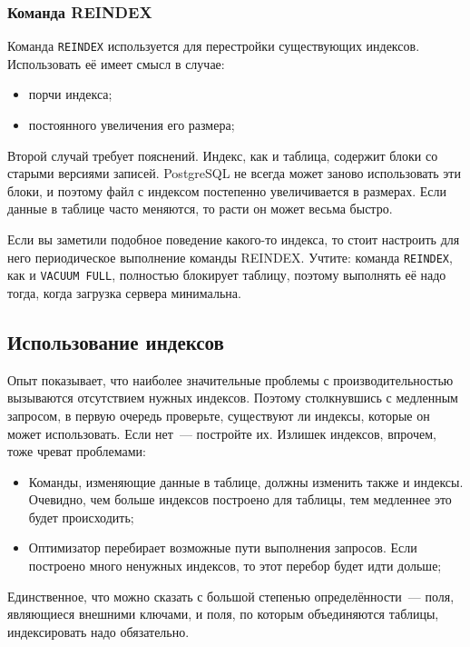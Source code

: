 \subsubsection{Команда REINDEX}

Команда \lstinline!REINDEX! используется для перестройки существующих индексов. Использовать её имеет смысл в случае:

\begin{itemize}
  \item порчи индекса;
  \item постоянного увеличения его размера;
\end{itemize}

Второй случай требует пояснений. Индекс, как и таблица, содержит блоки со старыми версиями записей. PostgreSQL не всегда может заново использовать эти блоки, и поэтому файл с индексом постепенно увеличивается в размерах. Если данные в таблице часто меняются, то расти он может весьма быстро.

Если вы заметили подобное поведение какого-то индекса, то стоит настроить для него периодическое выполнение команды REINDEX. Учтите: команда \lstinline!REINDEX!, как и \lstinline!VACUUM FULL!, полностью блокирует таблицу, поэтому выполнять её надо тогда, когда загрузка сервера минимальна.


\subsection{Использование индексов}

Опыт показывает, что наиболее значительные проблемы с производительностью вызываются отсутствием нужных индексов. Поэтому столкнувшись с медленным запросом, в первую очередь проверьте, существуют ли индексы, которые он может использовать. Если нет~--- постройте их. Излишек индексов, впрочем, тоже чреват проблемами:

\begin{itemize}
  \item Команды, изменяющие данные в таблице, должны изменить также и индексы. Очевидно, чем больше индексов построено для таблицы, тем медленнее это будет происходить;
  \item Оптимизатор перебирает возможные пути выполнения запросов. Если построено много ненужных индексов, то этот перебор будет идти дольше;
\end{itemize}

Единственное, что можно сказать с большой степенью определённости~--- поля, являющиеся внешними ключами, и поля, по которым объединяются таблицы, индексировать надо обязательно.


